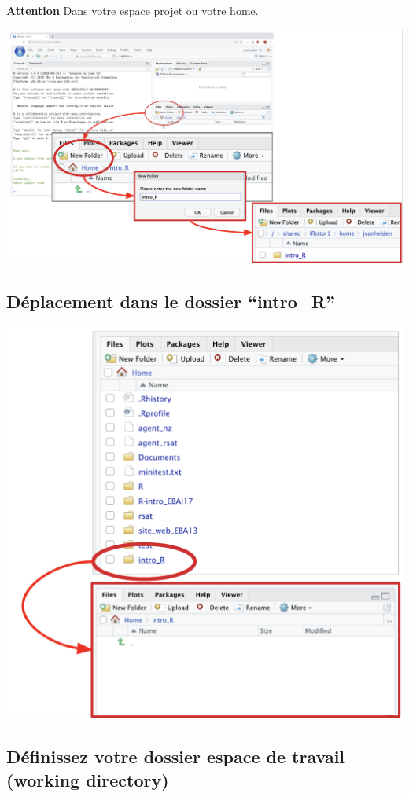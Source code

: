 \documentclass[
]{book}
\begin{document}
\textbf{Attention} Dans votre espace projet ou votre home.

\includegraphics{images/createIntro.png}

\hypertarget{duxe9placement-dans-le-dossier-intro_r}{%
\subsection{Déplacement dans le dossier ``intro\_R''}\label{duxe9placement-dans-le-dossier-intro_r}}

\includegraphics{images/moveIntro.png}

\hypertarget{duxe9finissez-votre-dossier-espace-de-travail-working-directory}{%
\subsection{Définissez votre dossier espace de travail (working directory)}\label{duxe9finissez-votre-dossier-espace-de-travail-working-directory}}
\end{document}
